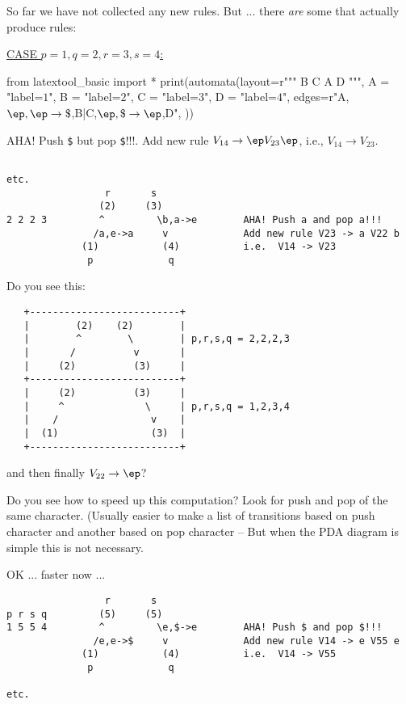 So far we have not collected any new rules.
But ... there \textit{are} some that actually produce rules:


\underline{CASE $p=1,q=2,r=3,s=4$:}
\begin{python}
from latextool_basic import *
print(automata(layout=r"""
   B C
A       D
""",
A = "label=$1$",
B = "label=$2$",
C = "label=$3$",
D = "label=$4$",
edges=r"A,$\ep,\ep\rightarrow\$$,B|C,$\ep,\$\rightarrow \ep$,D",
))
\end{python}
AHA! Push \verb!$! but pop \verb!$!!!!. 
Add new rule $V_{14} \rightarrow \ep V_{23} \ep$, i.e.,
$V_{14} \rightarrow V_{23}$.


\begin{samepage}
\begin{verbatim}

etc.
                 r       s
                (2)     (3)        
2 2 2 3         ^         \b,a->e        AHA! Push a and pop a!!!
               /a,e->a     v             Add new rule V23 -> a V22 b
             (1)           (4)           i.e.  V14 -> V23
              p             q

\end{verbatim}
\end{samepage}

Do you see this:
\begin{samepage}
\begin{verbatim}
   +--------------------------+
   |        (2)    (2)        |
   |        ^        \        | p,r,s,q = 2,2,2,3
   |       /          v       |
   |     (2)          (3)     |
   +--------------------------+
   |     (2)          (3)     |
   |     ^              \     | p,r,s,q = 1,2,3,4
   |    /                v    |
   |  (1)                (3)  |
   +--------------------------+
\end{verbatim}
\end{samepage}
and then finally $V_{22} \rightarrow \ep$?

Do you see how to speed up this computation? Look for push and pop
of the same character. (Usually easier to make a list of transitions
based on push character and another based on pop character --
But when the PDA diagram is simple this is not necessary.

OK ... faster now ...
\begin{samepage}
\begin{verbatim}
                 r       s
p r s q         (5)     (5)        
1 5 5 4         ^         \e,$->e        AHA! Push $ and pop $!!!
               /e,e->$     v             Add new rule V14 -> e V55 e
             (1)           (4)           i.e.  V14 -> V55
              p             q

etc.
\end{verbatim}
\end{samepage}

